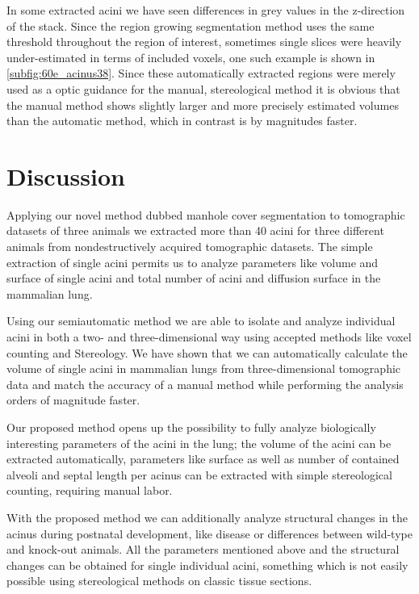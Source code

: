 \documentclass[paper=a4,abstract=true,english,DIV=calc]{scrartcl}
\begin{document}
In some extracted acini we have seen differences in grey values in the z-direction of the stack.
Since the region growing segmentation method uses the same threshold throughout the region of interest, sometimes single slices were heavily under-estimated in terms of included voxels, one such example is shown in \autoref{subfig:60e_acinus38}.
Since these automatically extracted regions were merely used as a optic guidance for the manual, stereological method it is obvious that the manual method shows slightly larger and more precisely estimated volumes than the automatic method, which in contrast is by magnitudes faster.

\section{Discussion}
Applying our novel method dubbed manhole cover segmentation to tomographic datasets of three animals we extracted more than 40 acini for three different animals from nondestructively acquired tomographic datasets.
The simple extraction of single acini permits us to analyze parameters like volume and surface of single acini and total number of acini and diffusion surface in the mammalian lung.

Using our semiautomatic method we are able to isolate and analyze individual acini in both a two- and three-dimensional way using accepted methods like voxel counting and Stereology.
We have shown that we can automatically calculate the volume of single acini in mammalian lungs from three-dimensional tomographic data and match the accuracy of a manual method while performing the analysis orders of magnitude faster.

Our proposed method opens up the possibility to fully analyze biologically interesting parameters of the acini in the lung; the volume of the acini can be extracted automatically, parameters like surface as well as number of contained alveoli and septal length per acinus can be extracted with simple stereological counting, requiring manual labor.

With the proposed method we can additionally analyze structural changes in the acinus during postnatal development, like disease or differences between wild-type and knock-out animals.
All the parameters mentioned above and the structural changes can be obtained for single individual acini, something which is not easily possible using stereological methods on classic tissue sections.
\end{document}
